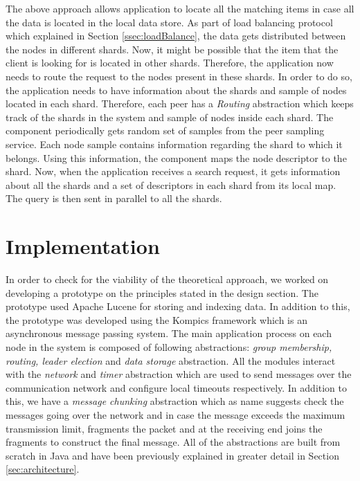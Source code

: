 \documentclass[a4paper,11pt]{kth-mag}
\begin{document}
\par The above approach allows application to locate all the matching items in case all the data is located in the local data store. As part of load balancing protocol which explained in Section \ref{ssec:loadBalance}, the data gets distributed between the nodes in different shards. Now, it might be possible that the item that the client is looking for is located in other shards. Therefore, the application now needs to route the request to the nodes present in these shards. In order to do so, the application needs to have information about the shards and sample of nodes located in each shard. Therefore, each peer has a \textit{Routing} abstraction which keeps track of the shards in the system and sample of nodes inside each shard. The component periodically gets random set of samples from the peer sampling service. Each node sample contains information regarding the shard to which it belongs. Using this information, the component maps the node descriptor to the shard. Now, when the application receives a search request, it gets information about all the shards and a set of descriptors in each shard from its local map. The query is then sent in parallel to all the shards.




\chapter{Implementation}
\label{chap:impl}

In order to check for the viability of the theoretical approach, we worked on developing a prototype on the principles stated in the design section. The prototype used Apache Lucene for storing and indexing data. In addition to this, the prototype was developed using the Kompics framework which is an asynchronous message passing system. The main application process on each node in the system is composed of following abstractions: \textit {group membership, routing, leader election} and \textit{data storage} abstraction. All the modules interact with the \textit{network} and \textit{timer} abstraction which are used to send messages over the communication network and configure local timeouts respectively. In addition to this, we have a \textit{message chunking} abstraction which as name suggests check the messages going over the network and in case the message exceeds the maximum transmission limit, fragments the packet and at the receiving end joins the fragments to construct the final message. All of the abstractions are built from scratch in Java and have been previously explained in greater detail in Section \ref{sec:architecture}.
\end{document}
